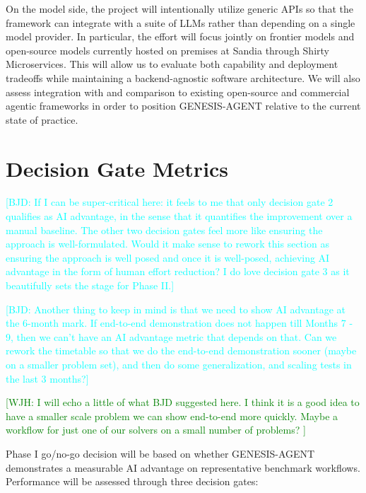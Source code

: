 \documentclass[11pt]{article} \usepackage[margin=1in]{geometry}
\newcommand{\bert}[1]{\textcolor{cyan}{[BJD: #1]}}
\newcommand{\wyatt}[1]{\textcolor{green}{[WJH: #1]}}
\begin{document}
On the model side, the project will intentionally utilize generic APIs so that the framework can integrate with a suite of LLMs rather than depending on a single model
provider. In particular, the effort will focus jointly on frontier models and open-source models currently hosted on premises at Sandia through Shirty Microservices. This will allow us to evaluate both capability and deployment tradeoffs while maintaining a backend-agnostic software architecture. We will also assess integration with and
comparison to existing open-source and commercial agentic frameworks in order to position GENESIS-AGENT relative to the current state of practice.

\section{Decision Gate Metrics}
\bert{If I can be super-critical here: it feels to me that only decision gate 2 qualifies as AI advantage, in the sense that it quantifies the improvement over a manual baseline.
The other two decision gates feel more like ensuring the approach is well-formulated.
Would it make sense to rework this section as ensuring the approach is well posed and once it is well-posed, achieving AI advantage in the form of human effort reduction?
I do love decision gate 3 as it beautifully sets the stage for Phase II.}

\bert{Another thing to keep in mind is that we need to show AI advantage at the 6-month mark.
If end-to-end demonstration does not happen till Months 7 - 9, then we can't have an AI advantage metric that depends on that. 
Can we rework the timetable so that we do the end-to-end demonstration sooner (maybe on a smaller problem set), and then do some generalization, and scaling tests in the last 3 months?}

\wyatt{I will echo a little of what BJD suggested here. I think it is a good idea to have a smaller scale problem we can show end-to-end more quickly. Maybe a workflow for just one of our solvers on a small number of problems? }

Phase I go/no-go decision will be based on whether GENESIS-AGENT
demonstrates a measurable AI advantage on representative benchmark workflows.
Performance will be assessed through three
decision gates:
\end{document}
